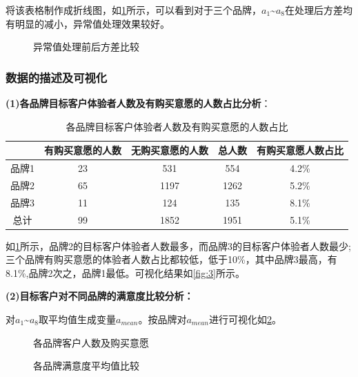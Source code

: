 \documentclass{JXUSTmodeling}
\begin{document}
将该表格制作成折线图，如\ref{fig:2}所示，可以看到对于三个品牌，$ a_{1} $\~{}$ a_{8} $在处理后方差均有明显的减小，异常值处理效果较好。
\begin{figure}[!htpb]
	\begin{minipage}{0.33\linewidth}
		\centering
	\end{minipage}
\begin{minipage}{0.33\linewidth}
	\centering
\end{minipage}
\begin{minipage}{0.33\linewidth}
	\centering
\end{minipage}
\caption{异常值处理前后方差比较}
\label{fig:2}
\end{figure}
\subsubsection{数据的描述及可视化}
\textbf{(1)各品牌目标客户体验者人数及有购买意愿的人数占比分析}：
\begin{table}[!htbp]
	\centering 
	\caption{\label{tab:rs}各品牌目标客户体验者人数及有购买意愿的人数占比}
	\begin{tabular}{ccccc}
		\toprule[1.5pt]
		&有购买意愿的人数&无购买意愿的人数&总人数&有购买意愿人数占比\\
		\midrule
		品牌1&23&531&554&4.2\%\\
		品牌2&65&1197&1262&5.2\% \\
		品牌3&11&124&135&8.1\%\\
		总计&99&1852&1951&5.1\%\\
		
		\bottomrule[1.5pt]
	\end{tabular}
\end{table}

如\ref{tab:rs}所示，品牌2的目标客户体验者人数最多，而品牌3的目标客户体验者人数最少;三个品牌有购买意愿的体验者人数占比都较低，低于10\%，其中品牌3最高，有8.1\%,品牌2次之，品牌1最低。可视化结果如\ref{fig:3}所示。


\textbf{(2)目标客户对不同品牌的满意度比较分析：}

对$ a_{1} $\~{}$ a_{8} $取平均值生成变量$ a_{mean} $。按品牌对$ a_{mean} $进行可视化如\ref{fig:4}。

\begin{figure}[!htpb]
	\begin{minipage}{0.48\linewidth}
		\centering
		\caption{各品牌客户人数及购买意愿}
		\label{fig:3}
	\end{minipage}
	\begin{minipage}{0.48\linewidth}
		\centering
		\caption{各品牌满意度平均值比较}
		\label{fig:4}
	\end{minipage}
	
\end{figure}
\end{document}
